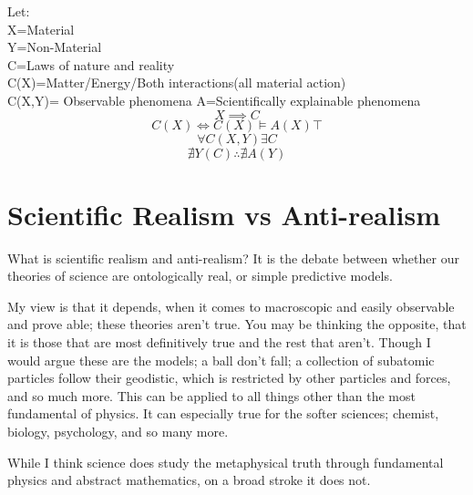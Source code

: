 Let: \\
X=Material \\
Y=Non-Material \\
C=Laws of nature and reality \\
C(X)=Matter/Energy/Both interactions(all material action) \\
C(X,Y)= Observable phenomena
A=Scientifically explainable phenomena \\
$$
X \implies C
$$
$$
C(X) \iff C(X) \models A(X) \top
$$
$$
\forall C(X,Y) \exists C
$$
$$
\nexists Y(C) \therefore \nexists A(Y)
$$
\section{Scientific Realism vs Anti-realism}
\par What is scientific realism and anti-realism? It is the debate between whether our theories of science are ontologically real, or simple predictive models.
\par My view is that it depends, when it comes to macroscopic and easily observable and prove able; these theories aren't true. You may be thinking the opposite, that it is those that are most definitively true and the rest that aren't. Though I would argue these are the models; a ball don't fall; a collection of subatomic particles follow their geodistic, which is restricted by other particles and forces, and so much more. This can be applied to all things other than the most fundamental of physics. It can especially true for the softer sciences; chemist, biology, psychology, and so many more.
\par While I think science does study the metaphysical truth through fundamental physics and abstract mathematics, on a broad stroke it does not.
